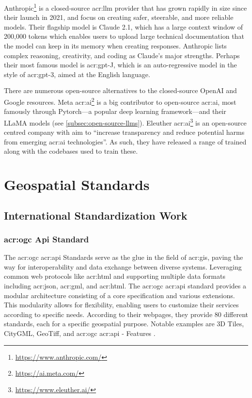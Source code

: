 Anthropic\footnote{\url{https://www.anthropic.com/}} is a closed-source \acrshort{acr:llm} provider that has grown rapidly in size since their launch in 2021, and focus on creating safer, steerable, and more reliable models. Their flagship model is Claude 2.1, which has a large context window of 200,000 tokens which enables users to upload large technical documentation that the model can keep in its memory when creating responses. Anthropic lists complex reasoning, creativity, and coding as Claude's major strengths. Perhaps their most famous model is \acrshort{acr:gpt}-J, which is an auto-regressive model in the style of \acrshort{acr:gpt}-3, aimed at the English language.

There are numerous open-source alternatives to the closed-source OpenAI and Google resources. Meta \acrshort{acr:ai}\footnote{\url{https://ai.meta.com/}} is a big contributor to open-source \acrshort{acr:ai}, most famously through Pytorch---a popular deep learning framework---and their LLaMA models (see \autoref{subsec:open-source-llms}). Eleuther \acrshort{acr:ai}\footnote{\url{https://www.eleuther.ai/}} is an open-source centred company with aim to \enquote{increase transparency and reduce potential harms from emerging \acrshort{acr:ai} technologies}. As such, they have released a range of trained  along with the codebases used to train these.

\section{Geospatial Standards}\label{sec:geospatial-standards}

\subsection{International Standardization Work}\label{subsec:standardization-international}

\subsubsection[OGC Standards]{\acrshort{acr:ogc} Api Standard}\label{subsubsec:ogc}

The \gls{acr:ogc} \acrshort{acr:api} Standards serve as the glue in the field of \gls{acr:gis}, paving the way for interoperability and data exchange between diverse systems. Leveraging common web protocols like \acrshort{acr:html} and supporting multiple data formats including \acrshort{acr:json}, \acrshort{acr:gml}, and \acrshort{acr:html}. The \gls{acr:ogc} \acrshort{acr:api} standard provides a modular architecture consisting of a core specification and various extensions. This modularity allows for flexibility, enabling users to customize their services according to specific needs. According to their webpages, they provide 80 different standards, each for a specific geospatial purpose. Notable examples are 3D Tiles, CityGML, GeoTiff, and \acrshort{acr:ogc} \acrshort{acr:api} - Features \citep{ogcOGCStandards2023}.

